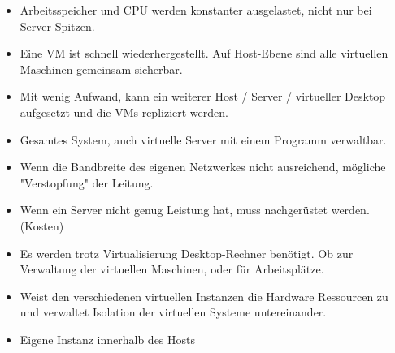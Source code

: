\documentclass[10pt,a4paper,ragged2e]{altacv}
\begin{document}
\begin{paracol}{2}

\begin{itemize}
\item Arbeitsspeicher und CPU werden konstanter ausgelastet, nicht nur bei Server-Spitzen.
\item Eine VM ist schnell wiederhergestellt. Auf Host-Ebene sind alle virtuellen Maschinen gemeinsam sicherbar.
\item Mit wenig Aufwand, kann ein weiterer Host \newline / Server / virtueller Desktop aufgesetzt und die VMs repliziert werden.  
\item Gesamtes System, auch virtuelle Server mit einem Programm verwaltbar.

\end{itemize}

\divider

\begin{itemize}
\item Wenn die Bandbreite des eigenen Netzwerkes nicht ausreichend, mögliche "Verstopfung" der Leitung.
\item Wenn ein Server nicht genug Leistung hat, \newline muss nachgerüstet werden. (Kosten)
\item Es werden trotz Virtualisierung Desktop-Rechner benötigt. Ob zur Verwaltung der virtuellen Maschinen, oder für Arbeitsplätze.

\end{itemize}


\begin{itemize}
\item Weist den verschiedenen virtuellen Instanzen die Hardware Ressourcen zu und verwaltet Isolation der virtuellen Systeme untereinander.
\end{itemize}

\vspace{3mm}

\begin{itemize}
    \item Eigene Instanz innerhalb des Hosts 
\end{itemize}


\end{paracol}
\end{document}
